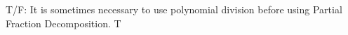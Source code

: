 {T/F: It is sometimes necessary to use polynomial division before using Partial Fraction Decomposition.}
{T}
